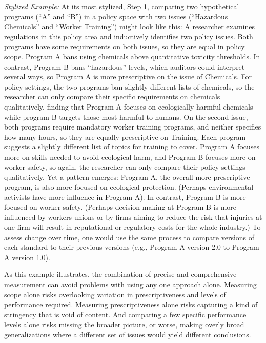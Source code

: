 \documentclass[
      12pt,
            Review ]{article}
\begin{document}
\emph{Stylized Example:} At its most stylized, Step 1, comparing two hypothetical programs (``A'' and ``B'') in a policy space with two issues (``Hazardous Chemicals'' and ``Worker Training'') might look like this: A researcher examines regulations in this policy area and inductively identifies two policy issues. Both programs have some requirements on both issues, so they are equal in policy scope. Program A bans using chemicals above quantitative toxicity thresholds. In contrast, Program B bans ``hazardous'' levels, which auditors could interpret several ways, so Program A is more prescriptive on the issue of Chemicals. For policy settings, the two programs ban slightly different lists of chemicals, so the researcher can only compare their specific requirements on chemicals qualitatively, finding that Program A focuses on ecologically harmful chemicals while program B targets those most harmful to humans. On the second issue, both programs require mandatory worker training programs, and neither specifies how many hours, so they are equally prescriptive on Training. Each program suggests a slightly different list of topics for training to cover. Program A focuses more on skills needed to avoid ecological harm, and Program B focuses more on worker safety, so again, the researcher can only compare their policy settings qualitatively. Yet a pattern emerges: Program A, the overall more prescriptive program, is also more focused on ecological protection. (Perhaps environmental activists have more influence in Program A). In contrast, Program B is more focused on worker safety. (Perhaps decision-making at Program B is more influenced by workers unions or by firms aiming to reduce the risk that injuries at one firm will result in reputational or regulatory costs for the whole industry.) To assess change over time, one would use the same process to compare versions of each standard to their previous versions (e.g., Program A version 2.0 to Program A version 1.0).

As this example illustrates, the combination of precise and comprehensive measurement can avoid problems with using any one approach alone. Measuring scope alone risks overlooking variation in prescriptiveness and levels of performance required. Measuring prescriptiveness alone risks capturing a kind of stringency that is void of content. And comparing a few specific performance levels alone risks missing the broader picture, or worse, making overly broad generalizations where a different set of issues would yield different conclusions.
\end{document}
